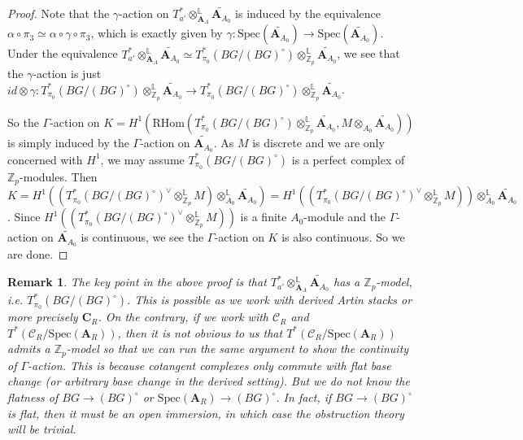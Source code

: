 \documentclass[10pt]{article}
\newtheorem{rmk}[thm]{Remark}
\numberwithin{equation}{section}
\newcommand{\bL}{{\mathbb L}}
\newcommand{\bZ}{{\mathbb Z}}
\newcommand{\calC}{{\mathcal C}}
\newcommand{\Spec}{{\mathrm{Spec}}}         %
\newcommand{\bfA}{{\textbf{A}}}
\newcommand{\bfC}{{\textbf{C}}}
\newcommand{\RHom}{{\mathrm{RHom}}}
\begin{document}
\begin{proof}
  Note that the $\gamma$-action on $T^*_{a'}\otimes^{\bL}_{\bfA_A}\widetilde{\bfA_{A_0}}$ is induced by the equivalence $\alpha\circ\pi_3\simeq \alpha\circ\gamma\circ\pi_3$, which is exactly given by $\gamma:\Spec(\widetilde{\bfA_{A_0}})\to \Spec(\widetilde{\bfA_{A_0}})$. Under the equivalence $T^*_{a'}\otimes^{\bL}_{\bfA_A}\widetilde{\bfA_{A_0}}\simeq T^*_{\pi_0}(BG/(BG)^{\circ})\otimes_{\bZ_p}^{\bL}\widetilde{\bfA_{A_0}}$, we see that the $\gamma$-action is just $id\otimes \gamma: T^*_{\pi_0}(BG/(BG)^{\circ})\otimes_{\bZ_p}^{\bL}\widetilde{\bfA_{A_0}}\to  T^*_{\pi_0}(BG/(BG)^{\circ})\otimes_{\bZ_p}^{\bL}\widetilde{\bfA_{A_0}}$.

  So the $\Gamma$-action on $K=H^1(\RHom(T^*_{\pi_0}(BG/(BG)^{\circ})\otimes_{\bZ_p}^{\bL}\widetilde{\bfA_{A_0}}, M\otimes_{A_0}\widetilde{\bfA_{A_0}}))$ is simply induced by the $\Gamma$-action on $\widetilde{\bfA_{A_0}}$. As $M$ is discrete and we are only concerned with $H^1$, we may assume $T^*_{\pi_0}(BG/(BG)^{\circ})$ is a perfect complex of $\bZ_p$-modules. Then $K=H^1((T^*_{\pi_0}(BG/(BG)^{\circ})^{\vee}\otimes_{\bZ_p}^{\bL}M)\otimes_{A_0}^{\bL}\widetilde{\bfA_{A_0}})=H^1((T^*_{\pi_0}(BG/(BG)^{\circ})^{\vee}\otimes_{\bZ_p}^{\bL}M))\otimes_{A_0}^{\bL}\widetilde{\bfA_{A_0}}$. Since $H^1((T^*_{\pi_0}(BG/(BG)^{\circ})^{\vee}\otimes_{\bZ_p}^{\bL}M))$ is a finite $A_0$-module and the $\Gamma$-action on $\widetilde{\bfA_{A_0}}$ is continuous, we see the $\Gamma$-action on $K$ is also continuous. So we are done.

\end{proof}

\begin{rmk}\label{why-derived}
   The key point in the above proof is that $T^*_{a'}\otimes^{\bL}_{\bfA_A}\widetilde{\bfA_{A_0}}$ has a $\bZ_p$-model, i.e. $T^*_{\pi_0}(BG/(BG)^{\circ})$. This is possible as we work with derived Artin stacks or more precisely $\bfC_R$. On the contrary, if we work with $\calC_R$ and $T^*(\calC_R/\Spec(\bfA_R))$, then it is not obvious to us that $T^*(\calC_R/\Spec(\bfA_R))$ admits a $\bZ_p$-model so that we can run the same argument to show the continuity of $\Gamma$-action. This is because cotangent complexes only commute with flat base change (or arbitrary base change in the derived setting). But we do not know the flatness of $BG\to (BG)^{\circ}$ or $\Spec(\bfA_R)\to (BG)^{\circ}$. In fact, if $BG\to (BG)^{\circ}$ is flat, then it must be an open immersion, in which case the obstruction theory will be trivial.
\end{rmk}
\end{document}
